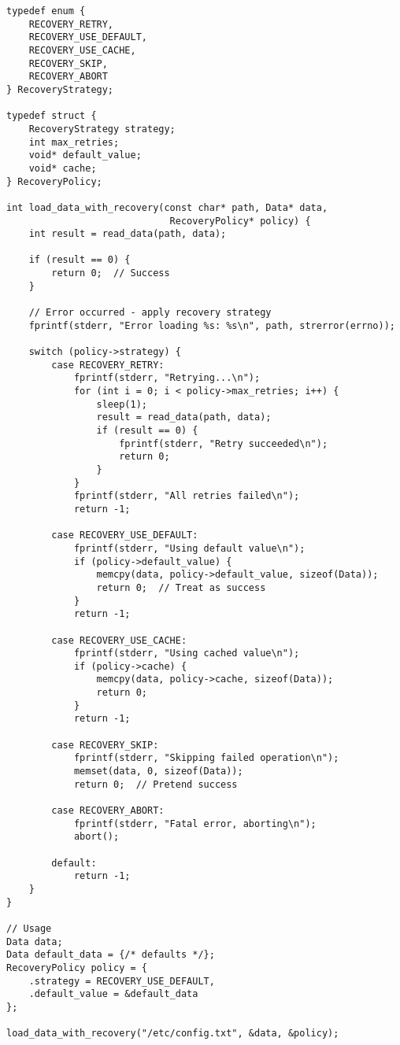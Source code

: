 \begin{lstlisting}
typedef enum {
    RECOVERY_RETRY,
    RECOVERY_USE_DEFAULT,
    RECOVERY_USE_CACHE,
    RECOVERY_SKIP,
    RECOVERY_ABORT
} RecoveryStrategy;

typedef struct {
    RecoveryStrategy strategy;
    int max_retries;
    void* default_value;
    void* cache;
} RecoveryPolicy;

int load_data_with_recovery(const char* path, Data* data,
                             RecoveryPolicy* policy) {
    int result = read_data(path, data);

    if (result == 0) {
        return 0;  // Success
    }

    // Error occurred - apply recovery strategy
    fprintf(stderr, "Error loading %s: %s\n", path, strerror(errno));

    switch (policy->strategy) {
        case RECOVERY_RETRY:
            fprintf(stderr, "Retrying...\n");
            for (int i = 0; i < policy->max_retries; i++) {
                sleep(1);
                result = read_data(path, data);
                if (result == 0) {
                    fprintf(stderr, "Retry succeeded\n");
                    return 0;
                }
            }
            fprintf(stderr, "All retries failed\n");
            return -1;

        case RECOVERY_USE_DEFAULT:
            fprintf(stderr, "Using default value\n");
            if (policy->default_value) {
                memcpy(data, policy->default_value, sizeof(Data));
                return 0;  // Treat as success
            }
            return -1;

        case RECOVERY_USE_CACHE:
            fprintf(stderr, "Using cached value\n");
            if (policy->cache) {
                memcpy(data, policy->cache, sizeof(Data));
                return 0;
            }
            return -1;

        case RECOVERY_SKIP:
            fprintf(stderr, "Skipping failed operation\n");
            memset(data, 0, sizeof(Data));
            return 0;  // Pretend success

        case RECOVERY_ABORT:
            fprintf(stderr, "Fatal error, aborting\n");
            abort();

        default:
            return -1;
    }
}

// Usage
Data data;
Data default_data = {/* defaults */};
RecoveryPolicy policy = {
    .strategy = RECOVERY_USE_DEFAULT,
    .default_value = &default_data
};

load_data_with_recovery("/etc/config.txt", &data, &policy);
\end{lstlisting}

